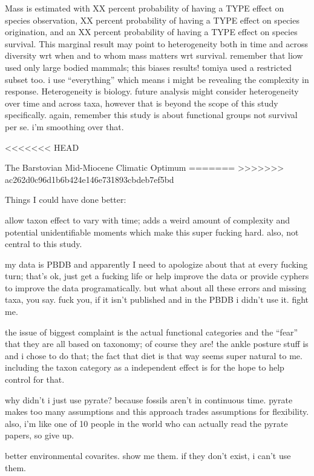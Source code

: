 \documentclass[12pt,letterpaper]{article}
\begin{document}
Mass is estimated with XX percent probability of having a TYPE effect on species observation, XX percent probability of having a TYPE effect on species origination, and an XX percent probability of having a TYPE effect on species survival. This marginal result may point to heterogeneity both in time and across diversity wrt when and to whom mass matters wrt survival. remember that liow used only large bodied mammals; this biases results! tomiya used a restricted subset too. i use ``everything'' which means i might be revealing the complexity in response. Heterogeneity is biology. future analysis might consider heterogeneity over time and across taxa, however that is beyond the scope of this study specifically. again, remember this study is about functional groups not survival per se. i'm smoothing over that.

<<<<<<< HEAD

The Barstovian Mid-Miocene Climatic Optimum
=======
>>>>>>> ac262d0c96d1b6b424e146e731893cbdeb7ef5bd





Things I could have done better: 

allow taxon effect to vary with time; adds a weird amount of complexity and potential unidentifiable moments which make this super fucking hard. also, not central to this study. 

my data is PBDB and apparently I need to apologize about that at every fucking turn; that's ok, just get a fucking life or help improve the data or provide cyphers to improve the data programatically. but what about all these errors and missing taxa, you say. fuck you, if it isn't published and in the PBDB i didn't use it. fight me.

the issue of biggest complaint is the actual functional categories and the ``fear'' that they are all based on taxonomy; of course they are! the ankle posture stuff is and i chose to do that; the fact that diet is that way seems super natural to me. including the taxon category as a independent effect is for the hope to help control for that. 

why didn't i just use pyrate? because fossils aren't in continuous time. pyrate makes too many assumptions and this approach trades assumptions for flexibility. also, i'm like one of 10 people in the world who can actually read the pyrate papers, so give up.

better environmental covarites. show me them. if they don't exist, i can't use them.
\end{document}
